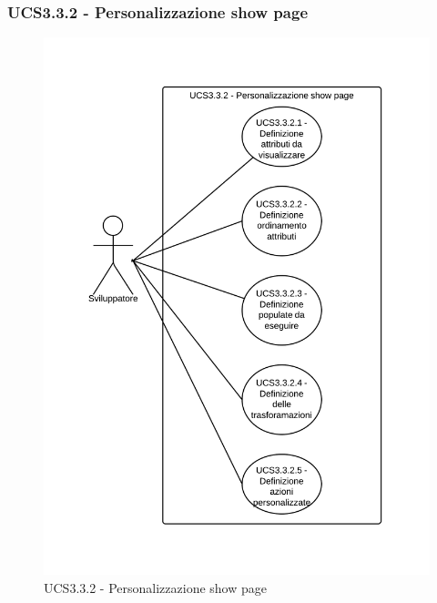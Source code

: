 \subsubsection{UCS3.3.2 - Personalizzazione show page} 
    \begin{figure}[H]
      \includegraphics[width=12cm]{UML/UCS3.3.2 - Personalizzazione show page.png}
      \caption{UCS3.3.2 - Personalizzazione show page} 
    \end{figure}
    
